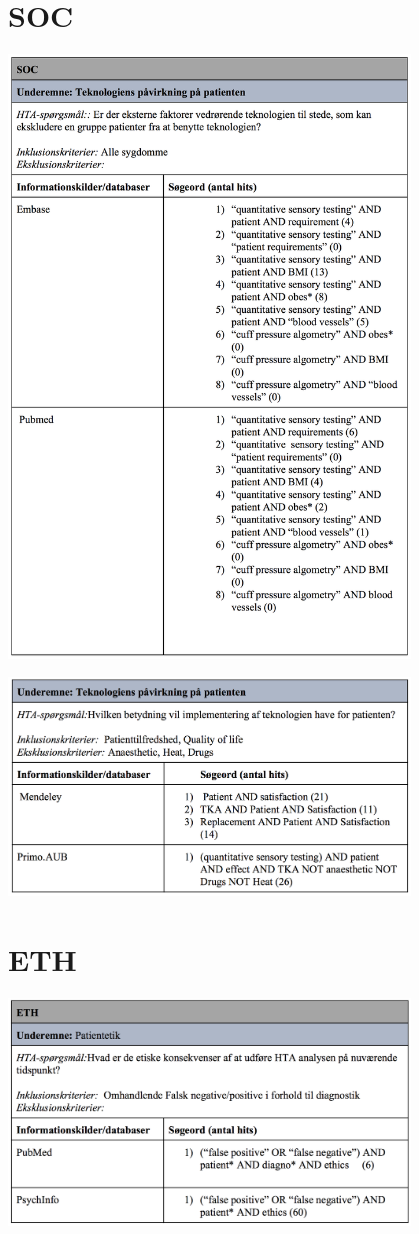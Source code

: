 \section{SOC}
\includegraphics[width=0.8\textwidth]{rapportAfsnit/qBilag/sogninger/SOC1}

\includegraphics[width=0.8\textwidth]{rapportAfsnit/qBilag/sogninger/SOC2}

\section{ETH}
\includegraphics[width=0.8\textwidth]{rapportAfsnit/qBilag/sogninger/ETH1}

